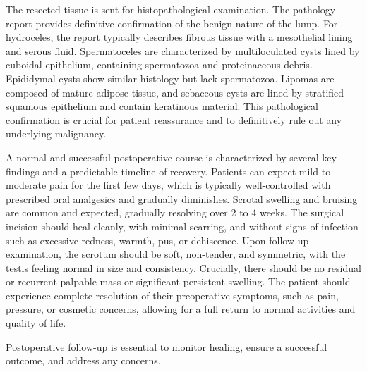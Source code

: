 The resected tissue is sent for histopathological examination. The pathology report provides definitive confirmation of the benign nature of the lump. For hydroceles, the report typically describes fibrous tissue with a mesothelial lining and serous fluid. Spermatoceles are characterized by multiloculated cysts lined by cuboidal epithelium, containing spermatozoa and proteinaceous debris. Epididymal cysts show similar histology but lack spermatozoa. Lipomas are composed of mature adipose tissue, and sebaceous cysts are lined by stratified squamous epithelium and contain keratinous material. This pathological confirmation is crucial for patient reassurance and to definitively rule out any underlying malignancy.

A normal and successful postoperative course is characterized by several key findings and a predictable timeline of recovery. Patients can expect mild to moderate pain for the first few days, which is typically well-controlled with prescribed oral analgesics and gradually diminishes. Scrotal swelling and bruising are common and expected, gradually resolving over 2 to 4 weeks. The surgical incision should heal cleanly, with minimal scarring, and without signs of infection such as excessive redness, warmth, pus, or dehiscence. Upon follow-up examination, the scrotum should be soft, non-tender, and symmetric, with the testis feeling normal in size and consistency. Crucially, there should be no residual or recurrent palpable mass or significant persistent swelling. The patient should experience complete resolution of their preoperative symptoms, such as pain, pressure, or cosmetic concerns, allowing for a full return to normal activities and quality of life.

Postoperative follow-up is essential to monitor healing, ensure a successful outcome, and address any concerns.

